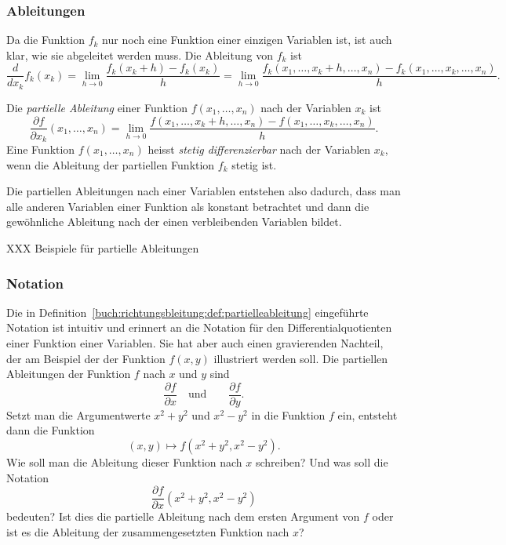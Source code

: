 %
%
\subsubsection{Ableitungen}
Da die Funktion $f_k$ nur noch eine Funktion einer einzigen Variablen
ist, ist auch klar, wie sie abgeleitet werden muss.
Die Ableitung von $f_k$ ist
\[
\frac{d}{dx_k} f_k(x_k)
=
\lim_{h\to 0} \frac{f_k(x_k+h)-f_k(x_k)}{h}
=
\lim_{h\to 0}
\frac{f_k(x_1,\dots,x_k+h,\dots,x_n)-f_k(x_1,\dots,x_k,\dots,x_n)}{h}.
\]

\begin{definition}
\label{buch:richtungsbleitung:def:partielleableitung}
Die {\em partielle Ableitung} einer Funktion $f(x_1,\dots,x_n)$ nach der
%
%
Variablen $x_k$ ist
\[
\frac{\partial f}{\partial x_k}(x_1,\dots,x_n)
=
\lim_{h\to 0}
\frac{f(x_1,\dots,x_k+h,\dots,x_n)-f(x_1,\dots,x_k,\dots,x_n)}{h}.
\]
Eine Funktion $f(x_1,\dots,x_n)$ heisst {\em stetig differenzierbar}
nach der Variablen $x_k$, wenn die Ableitung der partiellen Funktion 
$f_k$ stetig ist.
\end{definition}

Die partiellen Ableitungen nach einer Variablen entstehen also dadurch,
dass man alle anderen Variablen einer Funktion als konstant betrachtet
und dann die gewöhnliche Ableitung nach der einen verbleibenden Variablen
bildet.

XXX Beispiele für partielle Ableitungen

%
%
\subsubsection{Notation}
Die in Definition~\ref{buch:richtungsbleitung:def:partielleableitung}
eingeführte Notation ist intuitiv und erinnert an die Notation für den
Differentialquotienten einer Funktion einer Variablen.
Sie hat aber auch einen gravierenden Nachteil, der am Beispiel der
der Funktion $f(x,y)$ illustriert werden soll.
Die partiellen Ableitungen der Funktion $f$ nach $x$ und $y$ sind
\[
\frac{\partial f}{\partial x}
\quad\text{und}\qquad
\frac{\partial f}{\partial y}.
\]
Setzt man die Argumentwerte $x^2+y^2$ und $x^2-y^2$ in die Funktion
$f$ ein, entsteht dann die Funktion
\begin{equation}
(x,y) \mapsto f(x^2+y^2,x^2-y^2).
\label{buch:richtungsableitung:eqn:feingesetzt}
\end{equation}
Wie soll man die Ableitung dieser Funktion nach $x$ schreiben?
Und was soll die Notation
\[
\frac{\partial f}{\partial x}(x^2+y^2,x^2-y^2)
\]
bedeuten?
Ist dies die partielle Ableitung nach dem ersten Argument von $f$
oder ist es die Ableitung der zusammengesetzten Funktion nach $x$?

